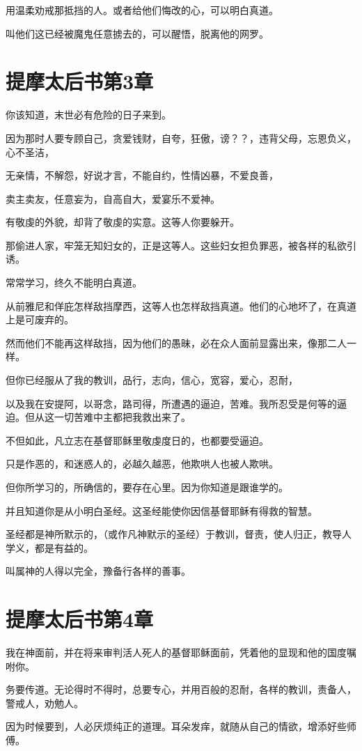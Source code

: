 \documentclass[12pt,oneside]{book}
\begin{document}
用温柔劝戒那抵挡的人。或者给他们悔改的心，可以明白真道。

叫他们这已经被魔鬼任意掳去的，可以醒悟，脱离他的网罗。

\chapter{提摩太后书第3章}
你该知道，末世必有危险的日子来到。

因为那时人要专顾自己，贪爱钱财，自夸，狂傲，谤？？，违背父母，忘恩负义，心不圣洁，

无亲情，不解怨，好说才言，不能自约，性情凶暴，不爱良善，

卖主卖友，任意妄为，自高自大，爱宴乐不爱神。

有敬虔的外貌，却背了敬虔的实意。这等人你要躲开。

那偷进人家，牢笼无知妇女的，正是这等人。这些妇女担负罪恶，被各样的私欲引诱。

常常学习，终久不能明白真道。

从前雅尼和佯庇怎样敌挡摩西，这等人也怎样敌挡真道。他们的心地坏了，在真道上是可废弃的。

然而他们不能再这样敌挡，因为他们的愚昧，必在众人面前显露出来，像那二人一样。

但你已经服从了我的教训，品行，志向，信心，宽容，爱心，忍耐，

以及我在安提阿，以哥念，路司得，所遭遇的逼迫，苦难。我所忍受是何等的逼迫。但从这一切苦难中主都把我救出来了。

不但如此，凡立志在基督耶稣里敬虔度日的，也都要受逼迫。

只是作恶的，和迷惑人的，必越久越恶，他欺哄人也被人欺哄。

但你所学习的，所确信的，要存在心里。因为你知道是跟谁学的。

并且知道你是从小明白圣经。这圣经能使你因信基督耶稣有得救的智慧。

圣经都是神所默示的，（或作凡神默示的圣经）于教训，督责，使人归正，教导人学义，都是有益的。

叫属神的人得以完全，豫备行各样的善事。

\chapter{提摩太后书第4章}
我在神面前，并在将来审判活人死人的基督耶稣面前，凭着他的显现和他的国度嘱咐你。

务要传道。无论得时不得时，总要专心，并用百般的忍耐，各样的教训，责备人，警戒人，劝勉人。

因为时候要到，人必厌烦纯正的道理。耳朵发痒，就随从自己的情欲，增添好些师傅。
\end{document}
